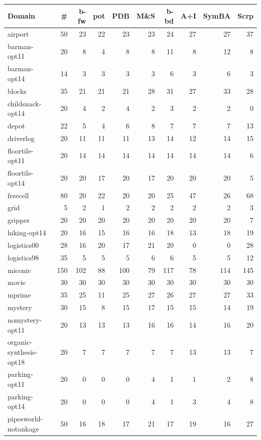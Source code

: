 \documentclass[letterpaper]{article}
\theoremstyle{plain}
\theoremstyle{definition}
\theoremstyle{remark}
\begin{document}
\begin{table}[p]
\centering
\small
\setlength{\tabcolsep}{4pt}
\begin{tabular}{lrrrrrrrrr}
\toprule
Domain & \# & b-fw & pot & PDB & M\&S & b-bd & A+I & SymBA & Scrp \\
\midrule
airport & 50 & 23 & 22 & 23 & 23 & 24 & 27 & 27 & 37 \\
barman-opt11 & 20 & 8 & 4 & 8 & 8 & 11 & 8 & 12 & 8 \\
barman-opt14 & 14 & 3 & 3 & 3 & 3 & 6 & 3 & 6 & 3 \\
blocks & 35 & 21 & 21 & 21 & 28 & 31 & 27 & 33 & 28 \\
childsnack-opt14 & 20 & 4 & 2 & 4 & 2 & 3 & 2 & 2 & 0 \\
depot & 22 & 5 & 4 & 6 & 8 & 7 & 7 & 7 & 13 \\
driverlog & 20 & 11 & 11 & 11 & 13 & 14 & 12 & 14 & 15 \\
floortile-opt11 & 20 & 14 & 14 & 14 & 14 & 14 & 14 & 14 & 6 \\
floortile-opt14 & 20 & 20 & 17 & 20 & 17 & 20 & 20 & 20 & 5 \\
freecell & 80 & 20 & 22 & 20 & 20 & 25 & 47 & 26 & 68 \\
grid & 5 & 2 & 1 & 2 & 2 & 2 & 2 & 2 & 3 \\
gripper & 20 & 20 & 20 & 20 & 20 & 20 & 20 & 20 & 7 \\
hiking-opt14 & 20 & 16 & 15 & 16 & 16 & 18 & 13 & 18 & 19 \\
logistics00 & 28 & 16 & 20 & 17 & 21 & 20 & 0 & 0 & 28 \\
logistics98 & 35 & 5 & 5 & 5 & 6 & 6 & 5 & 5 & 12 \\
miconic & 150 & 102 & 88 & 100 & 79 & 117 & 78 & 114 & 145 \\
movie & 30 & 30 & 30 & 30 & 30 & 30 & 30 & 30 & 30 \\
mprime & 35 & 25 & 11 & 25 & 27 & 26 & 27 & 27 & 33 \\
mystery & 30 & 15 & 8 & 15 & 17 & 15 & 15 & 14 & 19 \\
nomystery-opt11 & 20 & 13 & 13 & 13 & 16 & 16 & 14 & 16 & 20 \\
organic-synthesis-opt18 & 20 & 7 & 7 & 7 & 7 & 7 & 13 & 13 & 7 \\
parking-opt11 & 20 & 0 & 0 & 0 & 4 & 1 & 1 & 2 & 8 \\
parking-opt14 & 20 & 0 & 0 & 0 & 4 & 1 & 3 & 4 & 8 \\
pipesworld-notankage & 50 & 16 & 18 & 17 & 21 & 17 & 19 & 16 & 27 \\

\end{tabular}
\end{table}
\end{document}
